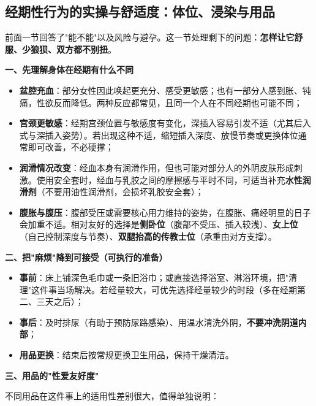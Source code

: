 \subsection{经期性行为的实操与舒适度：体位、浸染与用品}

前面一节回答了"能不能"以及风险与避孕。这一节处理剩下的问题：\textbf{怎样让它舒服、少狼狈、双方都不别扭}。

\textbf{一、先理解身体在经期有什么不同}

\begin{itemize}
\item \textbf{盆腔充血}：部分女性因此唤起更充分、感受更敏感；也有一部分人感到胀、钝痛，性欲反而降低。两种反应都常见，且同一个人在不同经期也可能不同；
\item \textbf{宫颈更敏感}：经期宫颈位置与敏感度有变化，深插入容易引发不适（尤其后入式与深插入姿势）。若出现这种不适，缩短插入深度、放慢节奏或更换体位通常即可改善，不必硬撑；
\item \textbf{润滑情况改变}：经血本身有润滑作用，但也可能对部分人的外阴皮肤形成刺激。使用安全套时，经血与乳胶之间的摩擦感与平时不同，可适当补充\textbf{水性润滑剂}（不要用油性润滑剂，会损坏乳胶安全套）；
\item \textbf{腹胀与腹压}：腹部受压或需要核心用力维持的姿势，在腹胀、痛经明显的日子会加重不适。相对友好的选择是\textbf{侧卧位}（腹部不受压、插入较浅）、\textbf{女上位}（自己控制深度与节奏）、\textbf{双腿抬高的传教士位}（承重由对方支撑）。
\end{itemize}

\textbf{二、把"麻烦"降到可接受（可执行的准备）}

\begin{itemize}
\item \textbf{事前}：床上铺深色毛巾或一条旧浴巾；或直接选择浴室、淋浴环境，把"清理"这件事当场解决。若经量较大，可优先选择经量较少的时段（多在经期第二、三天之后）；
\item \textbf{事后}：及时排尿（有助于预防尿路感染）、用温水清洗外阴，\textbf{不要冲洗阴道内部}；
\item \textbf{用品更换}：结束后按常规更换卫生用品，保持干燥清洁。
\end{itemize}

\textbf{三、用品的"性爱友好度"}

不同用品在这件事上的适用性差别很大，值得单独说明：

